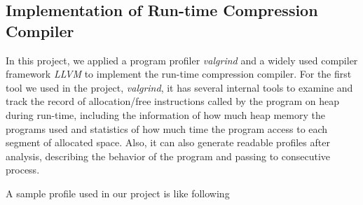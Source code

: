 \documentclass[]{article}
\begin{document}
	\subsection{Implementation of Run-time Compression Compiler}
	In this project, we applied a program profiler \textit{valgrind} and a widely used compiler framework \textit{LLVM} to implement the run-time compression compiler. For the first tool we used in the project, \textit{valgrind}, it has several internal tools to examine and track the record of allocation/free instructions called by the program on heap during run-time, including the information of how much heap memory the programs used and statistics of how much time the program access to each segment of allocated space. Also, it can also generate readable profiles after analysis, describing the behavior of the program and passing to consecutive process. \par 
	A sample profile used in our project is like following
\end{document}
